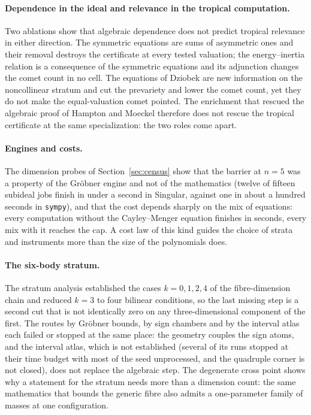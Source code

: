 \documentclass[11pt]{article}
\theoremstyle{definition}
\theoremstyle{remark}
\begin{document}
\paragraph{Dependence in the ideal and relevance in the tropical computation.}
Two ablations show that algebraic dependence does not predict tropical relevance in either direction. The symmetric equations are sums of asymmetric ones and their
removal destroys the certificate at every tested valuation; the energy--inertia relation is a consequence of the symmetric equations and its adjunction changes the comet count in
no cell. The equations of Dziobek are new information on the noncollinear stratum and cut the prevariety and lower the comet count, yet they do not make the equal-valuation comet pointed. The
enrichment that rescued the algebraic proof of Hampton and Moeckel \cite{HM06} therefore does not rescue the tropical certificate at the same specialization: the two roles come apart.

\paragraph{Engines and costs.}
The dimension probes of Section~\ref{sec:census} show that the barrier at $n=5$ was a property of the Gr\"obner engine and not of the mathematics (twelve of fifteen subideal jobs finish in under a
second in Singular, against one in about a hundred seconds in \texttt{sympy}), and that the cost depends sharply on the mix of equations: every computation without the Cayley--Menger
equation finishes in seconds, every mix with it reaches the cap. A cost law of this kind guides the choice of strata and instruments more than the size of the polynomials does.

\paragraph{The six-body stratum.}
The stratum analysis established the cases $k=0,1,2,4$ of the fibre-dimension chain and reduced $k=3$ to four bilinear conditions, so the last missing step is a second cut that is not identically zero on any three-dimensional component
of the first. The routes by Gr\"obner bounds, by sign chambers and by the interval atlas each failed or stopped at the same place: the geometry couples the sign atoms, and the interval atlas, which is not established (several of its runs stopped at their time budget with most of the seed unprocessed, and the quadruple corner is not closed), does not replace the algebraic step. The degenerate cross point shows why a statement for the stratum
needs more than a dimension count: the same mathematics that bounds the generic fibre also admits a one-parameter family of masses at one configuration.
\end{document}
